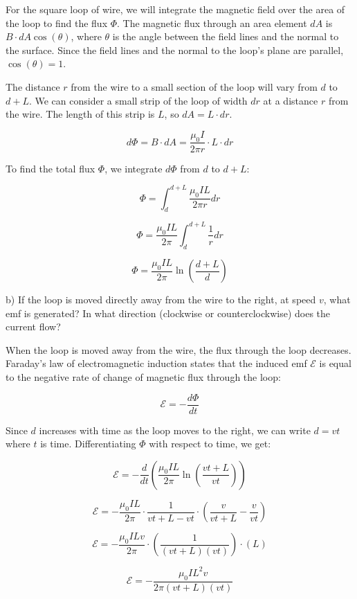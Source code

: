 For the square loop of wire, we will integrate the magnetic field over the area of the loop to find the flux \( \Phi \). The magnetic flux through an area element \( dA \) is \( B \cdot dA \cos(\theta) \), where \( \theta \) is the angle between the field lines and the normal to the surface. Since the field lines and the normal to the loop's plane are parallel, \( \cos(\theta) = 1 \).

The distance \( r \) from the wire to a small section of the loop will vary from \( d \) to \( d + L \). We can consider a small strip of the loop of width \( dr \) at a distance \( r \) from the wire. The length of this strip is \( L \), so \( dA = L \cdot dr \).

\[
d\Phi = B \cdot dA = \frac{\mu_0 I}{2 \pi r} \cdot L \cdot dr
\]

To find the total flux \( \Phi \), we integrate \( d\Phi \) from \( d \) to \( d + L \):

\[
\Phi = \int_{d}^{d+L} \frac{\mu_0 I L}{2 \pi r} dr
\]

\[
\Phi = \frac{\mu_0 I L}{2 \pi} \int_{d}^{d+L} \frac{1}{r} dr
\]

\[
\Phi = \frac{\mu_0 I L}{2 \pi} \ln\left(\frac{d+L}{d}\right)
\]

b) If the loop is moved directly away from the wire to the right, at speed \( v \), what emf is generated? In what direction (clockwise or counterclockwise) does the current flow?

When the loop is moved away from the wire, the flux through the loop decreases. Faraday's law of electromagnetic induction states that the induced emf \( \mathcal{E} \) is equal to the negative rate of change of magnetic flux through the loop:

\[
\mathcal{E} = -\frac{d\Phi}{dt}
\]

Since \( d \) increases with time as the loop moves to the right, we can write \( d = vt \) where \( t \) is time. Differentiating \( \Phi \) with respect to time, we get:

\[
\mathcal{E} = -\frac{d}{dt}\left(\frac{\mu_0 I L}{2 \pi} \ln\left(\frac{vt+L}{vt}\right)\right)
\]

\[
\mathcal{E} = -\frac{\mu_0 I L}{2 \pi} \cdot \frac{1}{vt+L - vt} \cdot \left(\frac{v}{vt+L} - \frac{v}{vt}\right)
\]

\[
\mathcal{E} = -\frac{\mu_0 I L v}{2 \pi} \cdot \left(\frac{1}{(vt+L)(vt)}\right) \cdot (L)
\]

\[
\mathcal{E} = -\frac{\mu_0 I L^2 v}{2 \pi (vt+L)(vt)}
\]

